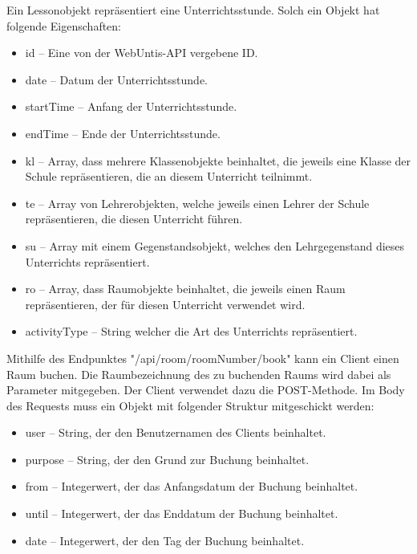 
Ein Lessonobjekt repräsentiert eine Unterrichtsstunde. Solch ein Objekt hat folgende Eigenschaften: 

\begin{itemize}
    \item id -- Eine von der WebUntis-API vergebene ID.
    \item date -- Datum der Unterrichtsstunde.
    \item startTime -- Anfang der Unterrichtsstunde.
    \item endTime -- Ende der Unterrichtsstunde.
    \item kl -- Array, dass mehrere Klassenobjekte beinhaltet, die jeweils eine Klasse der Schule repräsentieren, die an diesem Unterricht teilnimmt. 
    \item te -- Array von Lehrerobjekten, welche jeweils einen Lehrer der Schule repräsentieren, die diesen Unterricht führen. 
    \item su -- Array mit einem Gegenstandsobjekt, welches den Lehrgegenstand dieses Unterrichts repräsentiert.
    \item ro -- Array, dass Raumobjekte beinhaltet, die jeweils einen Raum repräsentieren, der für diesen Unterricht verwendet wird. 
    \item activityType -- String welcher die Art des Unterrichts repräsentiert. 
\end{itemize}


Mithilfe des Endpunktes "/api/room/{roomNumber}/book" kann ein Client einen Raum buchen. Die Raumbezeichnung des zu buchenden Raums wird dabei als Parameter mitgegeben. Der Client verwendet dazu die POST-Methode. Im Body des Requests muss ein Objekt mit folgender Struktur mitgeschickt werden: 

\begin{itemize}
    \item user -- String, der den Benutzernamen des Clients beinhaltet. 
    \item purpose -- String, der den Grund zur Buchung beinhaltet.
    \item from -- Integerwert, der das Anfangsdatum der Buchung beinhaltet.
    \item until -- Integerwert, der das Enddatum der Buchung beinhaltet.
    \item date -- Integerwert, der den Tag der Buchung beinhaltet. 
\end{itemize}

